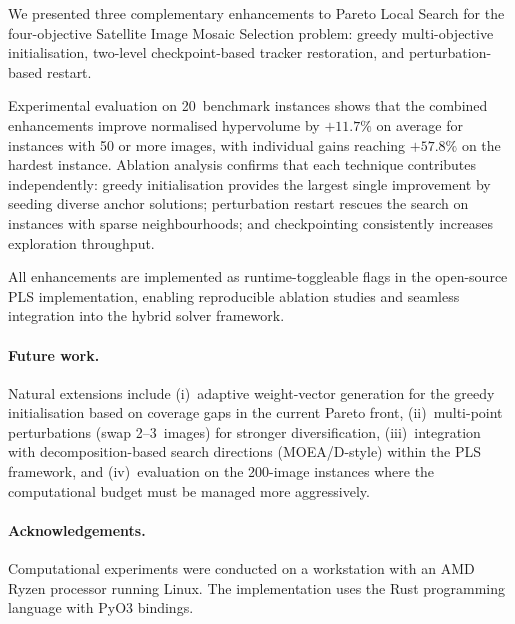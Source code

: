 \documentclass[11pt,a4paper]{article}
\begin{document}
We presented three complementary enhancements to Pareto Local Search
for the four-objective Satellite Image Mosaic Selection problem:
greedy multi-objective initialisation, two-level checkpoint-based
tracker restoration, and perturbation-based restart.

Experimental evaluation on 20~benchmark instances shows that the
combined enhancements improve normalised hypervolume by $+11.7\%$ on
average for instances with 50 or more images, with individual gains
reaching $+57.8\%$ on the hardest instance.  Ablation analysis confirms
that each technique contributes independently: greedy initialisation
provides the largest single improvement by seeding diverse anchor
solutions; perturbation restart rescues the search on instances with
sparse neighbourhoods; and checkpointing consistently increases
exploration throughput.

All enhancements are implemented as runtime-toggleable flags in the
open-source PLS implementation, enabling reproducible ablation studies
and seamless integration into the hybrid solver framework.

\paragraph{Future work.}
Natural extensions include (i)~adaptive weight-vector generation for
the greedy initialisation based on coverage gaps in the current Pareto
front, (ii)~multi-point perturbations (swap 2--3~images) for stronger
diversification, (iii)~integration with decomposition-based search
directions (MOEA/D-style) within the PLS framework, and
(iv)~evaluation on the 200-image instances where the
computational budget must be managed more aggressively.

\paragraph{Acknowledgements.}
Computational experiments were conducted on a workstation with an AMD
Ryzen processor running Linux.  The implementation uses the Rust
programming language with PyO3 bindings.

\end{document}
